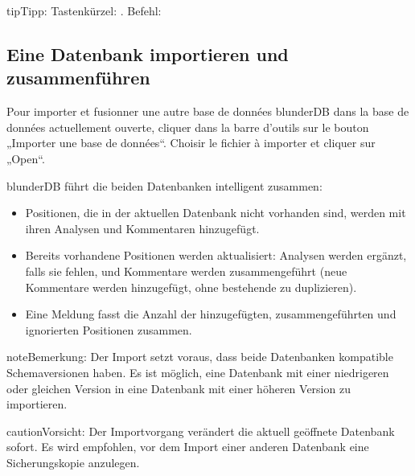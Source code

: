 \documentclass[letterpaper,10pt,german]{sphinxmanual}
\begin{document}
\begin{sphinxadmonition}{tip}{Tipp:}
\sphinxAtStartPar
Tastenkürzel: . Befehl: 
\end{sphinxadmonition}


\subsection{Eine Datenbank importieren und zusammenführen}
\label{\detokenize{guide_utilisateur:importer-et-fusionner-une-base-de-donnees}}
\sphinxAtStartPar
Pour importer et fusionner une autre base de données blunderDB dans la base de
données actuellement ouverte, cliquer dans la barre d’outils sur le bouton
„Importer une base de données“. Choisir le fichier  à importer et
cliquer sur „Open“.

\sphinxAtStartPar
blunderDB führt die beiden Datenbanken intelligent zusammen:
\begin{itemize}
\item {} 
\sphinxAtStartPar
Positionen, die in der aktuellen Datenbank nicht vorhanden sind, werden mit ihren Analysen und Kommentaren hinzugefügt.

\item {} 
\sphinxAtStartPar
Bereits vorhandene Positionen werden aktualisiert: Analysen werden ergänzt, falls sie fehlen, und Kommentare werden zusammengeführt (neue Kommentare werden hinzugefügt, ohne bestehende zu duplizieren).

\item {} 
\sphinxAtStartPar
Eine Meldung fasst die Anzahl der hinzugefügten, zusammengeführten und ignorierten Positionen zusammen.

\end{itemize}

\begin{sphinxadmonition}{note}{Bemerkung:}
\sphinxAtStartPar
Der Import setzt voraus, dass beide Datenbanken kompatible Schemaversionen haben. Es ist möglich, eine Datenbank mit einer niedrigeren oder gleichen Version in eine Datenbank mit einer höheren Version zu importieren.
\end{sphinxadmonition}

\begin{sphinxadmonition}{caution}{Vorsicht:}
\sphinxAtStartPar
Der Importvorgang verändert die aktuell geöffnete Datenbank sofort. Es wird empfohlen, vor dem Import einer anderen Datenbank eine Sicherungskopie anzulegen.
\end{sphinxadmonition}
\end{document}
